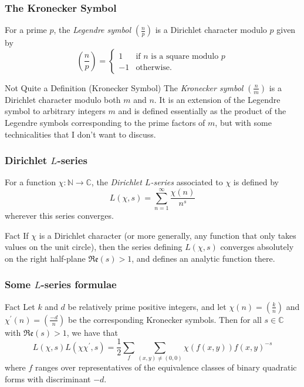 \documentclass[handout]{beamer}
\newcommand{\legendre}[2]{\ensuremath{\left(\frac{#1}{#2}\right)}}
\begin{document}
\begin{frame}
	
	\frametitle{The Kronecker Symbol}

	\begin{definition}
		For a prime $p$, the \emph{Legendre symbol} $\legendre{n}{p}$ is a Dirichlet character modulo $p$ given by
		\[
			\legendre{n}{p} = \begin{cases} 1 & \text{if $n$ is a square modulo $p$} \\ -1 & \text{otherwise.} \end{cases}
		\]
	\end{definition}
	\pause

	\begin{block}{Not Quite a Definition (Kronecker Symbol)}
		The \emph{Kronecker symbol} $\legendre{n}{m}$ is a Dirichlet character modulo both $m$ and $n$. It is an extension of the Legendre symbol to arbitrary integers $m$  and is defined essentially as the product of the Legendre symbols corresponding to the prime factors of $m$, but with some technicalities that I don't want to discuss.
	\end{block}

\end{frame}

\begin{frame}

	\frametitle{Dirichlet $L$-series}

	\begin{definition}[$L$-series]
		For a function $\chi : \mathbb{N} \to \mathbb{C}$, the \emph{Dirichlet $L$-series} associated to $\chi$ is defined by
		\[
			L(\chi, s) = \sum_{n = 1}^{\infty} \frac{\chi(n)}{n^s}
		\]
		wherever this series converges.
	\end{definition}

	\begin{block}{Fact}
		If $\chi$ is a Dirichlet character (or more generally, any function that only takes values on the unit circle), then the series defining $L(\chi, s)$ converges absolutely on the right half-plane $\mathfrak{Re}(s) > 1$, and defines an analytic function there.
	\end{block}
\end{frame}

\begin{frame}

	\frametitle{Some $L$-series formulae}

	\begin{block}{Fact}
		Let $k$ and $d$ be relatively prime positive integers, and let $\chi(n) = \legendre{k}{n}$ and $\chi^\prime(n) = \legendre{-d}{n}$ be the corresponding Kronecker symbols. Then for all $s \in \mathbb{C}$ with $\mathfrak{Re}(s) > 1$, we have that
		\[
			L(\chi, s) L(\chi \chi^\prime, s) = \frac{1}{2} \sum_{f} \sum_{(x, y) \neq (0, 0)} \chi(f(x, y)) {f(x, y)}^{-s}
		\]
		where $f$ ranges over representatives of the equivalence classes of binary quadratic forms with discriminant $-d$.
	\end{block}

\end{frame}
\end{document}

